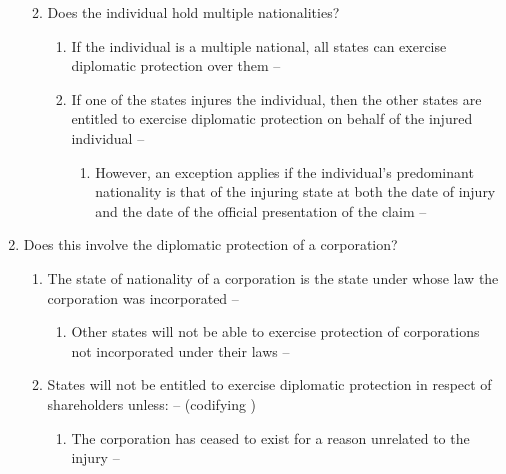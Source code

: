\begin{enumerate}
\begin{enumerate}
\begin{enumerate}
        \end{enumerate}
        \item Does the individual hold multiple nationalities?
        \begin{enumerate}
            \item If the individual is a multiple national, all states can exercise diplomatic protection over them -- 
            \item If one of the states injures the individual, then the other states are entitled to exercise diplomatic protection on behalf of the injured individual -- 
            \begin{enumerate}
                \item However, an exception applies if the individual's predominant nationality is that of the injuring state at both the date of injury and the date of the official presentation of the claim -- 
            \end{enumerate}
        \end{enumerate}
    \end{enumerate}
    \item Does this involve the diplomatic protection of a corporation?
    \begin{enumerate}
        \item The state of nationality of a corporation is the state under whose law the corporation was incorporated -- 
        \begin{enumerate}
            \item Other states will not be able to exercise protection of corporations not incorporated under their laws -- 
        \end{enumerate}
        \item States will not be entitled to exercise diplomatic protection in respect of shareholders unless: --  (codifying )
        \begin{enumerate}
            \item The corporation has ceased to exist for a reason unrelated to the injury -- 

\end{enumerate}
\end{enumerate}
\end{enumerate}
